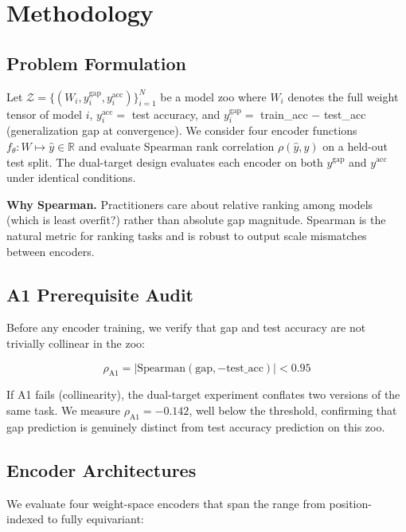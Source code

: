 \section{Methodology}
\label{sec:method}

\subsection{Problem Formulation}

Let $\mathcal{Z} = \{(W_i, y_i^{\text{gap}}, y_i^{\text{acc}})\}_{i=1}^N$ be a model zoo where $W_i$
denotes the full weight tensor of model $i$, $y_i^{\text{acc}} = $ test accuracy, and
$y_i^{\text{gap}} = $ train\_acc $-$ test\_acc (generalization gap at convergence). We consider four
encoder functions $f_\theta : W \mapsto \hat{y} \in \mathbb{R}$ and evaluate Spearman rank correlation
$\rho(\hat{y}, y)$ on a held-out test split. The dual-target design evaluates each encoder on both
$y^{\text{gap}}$ and $y^{\text{acc}}$ under identical conditions.

\textbf{Why Spearman.} Practitioners care about relative ranking among models (which is least overfit?) rather
than absolute gap magnitude. Spearman is the natural metric for ranking tasks and is robust to output
scale mismatches between encoders.

\subsection{A1 Prerequisite Audit}

Before any encoder training, we verify that gap and test accuracy are not trivially collinear in the zoo:

\begin{equation}
\rho_{\text{A1}} = |\text{Spearman}(\text{gap}, -\text{test\_acc})| < 0.95
\end{equation}

If A1 fails (collinearity), the dual-target experiment conflates two versions of the same task. We measure
$\rho_{\text{A1}} = -0.142$, well below the threshold, confirming that gap prediction is genuinely
distinct from test accuracy prediction on this zoo.

\subsection{Encoder Architectures}

We evaluate four weight-space encoders that span the range from position-indexed to fully equivariant:

